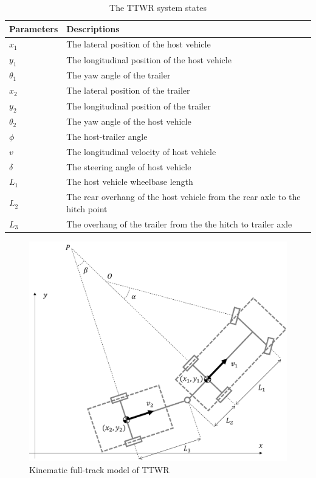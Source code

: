 \begin{table}
\centering
\caption{The TTWR system states}
\setlength{\tabcolsep}{12pt}
\begin{tabular}{|p{3cm}|p{9cm}|}
\hline
Parameters& 
Descriptions  \\
\hline
$x_1 $& 
The lateral position of the host vehicle \\
$y_1$& 
The longitudinal position of the host vehicle \\
$\theta_1$& 
The yaw angle of the trailer \\
$x_2 $& 
The lateral position of the trailer \\
$y_2$& 
The longitudinal position of the trailer \\
$\theta_2$& 
The yaw angle of the host vehicle \\
$\phi $& 
The host-trailer angle \\
$v$& 
The longitudinal velocity of host vehicle \\
$\delta $& 
The steering angle of host vehicle \\
$L_1$& 
The host vehicle wheelbase length \\
$L_2$& 
The rear overhang of the host vehicle from the rear axle to the hitch point \\
$L_3$& 
The overhang of the trailer from the the hitch to trailer axle \\
\hline
\end{tabular}
\label{table: ttwr system states}
\end{table}

\begin{figure}[h]
\centering
\includegraphics[scale=0.35]{fig/full_track_vehicle_model.png}
\caption{Kinematic full-track model of TTWR}
\label{fig:full track kinematics mdoel}
\end{figure}


